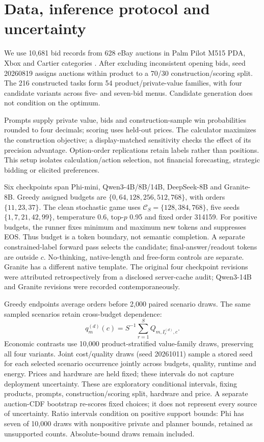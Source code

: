 \documentclass[sigconf,anonymous,nonacm]{acmart}
\begin{document}
\section{Data, inference protocol and uncertainty}
\label{sec:protocol}
We use 10,681 bid records from 628 eBay auctions in Palm Pilot M515 PDA, Xbox and Cartier categories \citep{jank2010modeling,onlineauctionsdataset}. After excluding inconsistent opening bids, seed 20260819 assigns auctions within product to a 70/30 construction/scoring split. The 216 constructed tasks form 54 product/private-value families, with four candidate variants across five- and seven-bid menus. Candidate generation does not condition on the optimum.

Prompts supply private value, bids and construction-sample win probabilities rounded to four decimals; scoring uses held-out prices. The calculator maximizes the construction objective; a display-matched sensitivity checks the effect of its precision advantage. Option-order replications retain labels rather than positions. This setup isolates calculation/action selection, not financial forecasting, strategic bidding or elicited preferences.

Six checkpoints span Phi-mini, Qwen3-4B/8B/14B, DeepSeek-8B and Granite-8B. Greedy assigned budgets are $\{0,\allowbreak64,\allowbreak128,\allowbreak256,\allowbreak512,\allowbreak768\}$, with orders $\{11,23,37\}$. The clean stochastic game uses $\mathcal C_S=\{128,\allowbreak384,\allowbreak768\}$, five seeds $\{1,7,21,42,99\}$, temperature 0.6, top-$p$ 0.95 and fixed order 314159. For positive budgets, the runner fixes minimum and maximum new tokens and suppresses EOS. Thus budget is a token boundary, not semantic completion. A separate constrained-label forward pass selects the candidate; final-answer/readout tokens are outside $c$. No-thinking, native-length and free-form controls are separate. Granite has a different native template. The original four checkpoint revisions were attributed retrospectively from a disclosed server-cache audit; Qwen3-14B and Granite revisions were recorded contemporaneously.

Greedy endpoints average orders before 2,000 paired scenario draws. The same sampled scenarios retain cross-budget dependence:
\begin{equation}
q_m^{(d)}(c)=S^{-1}\sum_{r=1}^S Q_{m,I_r^{(d)},c}.
\label{eq:bootstrapfrontier}\end{equation}
Economic contrasts use 10,000 product-stratified value-family draws, preserving all four variants. Joint cost/quality draws (seed 20261011) sample a stored seed for each selected scenario occurrence jointly across budgets, quality, runtime and energy. Prices and hardware are held fixed; these intervals do not capture deployment uncertainty. These are exploratory conditional intervals, fixing products, prompts, construction/scoring split, hardware and price. A separate auction-CDF bootstrap re-scores fixed choices; it does not represent every source of uncertainty. Ratio intervals condition on positive support bounds: Phi has seven of 10,000 draws with nonpositive private and planner bounds, retained as unsupported counts. Absolute-bound draws remain included.
\end{document}
